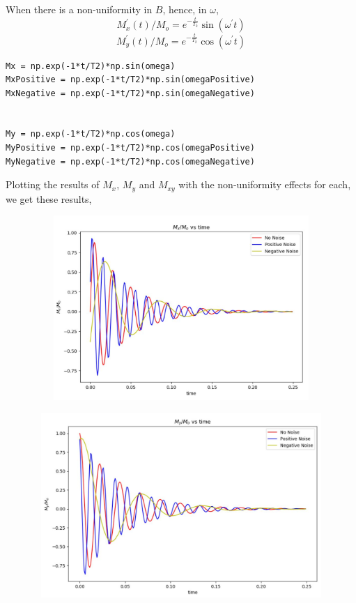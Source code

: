 \documentclass[18pt]{extarticle}
\begin{document}
When there is a non-uniformity in $B$, hence, in $\omega$,
\begin{equation*}
M_x^{'}(t) / M_o = e^{-\frac{t}{T_2}} \sin (\omega^{'} t)
\end{equation*}
\begin{equation*}
M_y^{'}(t) / M_o = e^{-\frac{t}{T_2}} \cos (\omega^{'} t)
\end{equation*}
\begin{lstlisting}
Mx = np.exp(-1*t/T2)*np.sin(omega)
MxPositive = np.exp(-1*t/T2)*np.sin(omegaPositive)
MxNegative = np.exp(-1*t/T2)*np.sin(omegaNegative)


My = np.exp(-1*t/T2)*np.cos(omega)
MyPositive = np.exp(-1*t/T2)*np.cos(omegaPositive)
MyNegative = np.exp(-1*t/T2)*np.cos(omegaNegative)
\end{lstlisting}
Plotting the results of $M_x$, $M_y$ and $M_{xy}$ with the non-uniformity effects for each, we get these results,
\begin{center}
	\includegraphics[width=15cm, height=7cm]{mx}
\end{center}
\begin{center}
	\includegraphics[width=15cm, height=7cm]{my}
\end{center}
\end{document}
